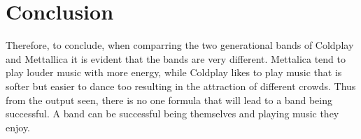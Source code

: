 \documentclass[11pt,preprint, authoryear]{elsarticle}
\numberwithin{equation}{section}
\numberwithin{figure}{section}
\numberwithin{table}{section}
\begin{document}
\hypertarget{conclusion}{%
\section{Conclusion}\label{conclusion}}

Therefore, to conclude, when comparring the two generational bands of
Coldplay and Mettallica it is evident that the bands are very different.
Mettalica tend to play louder music with more energy, while Coldplay
likes to play music that is softer but easier to dance too resulting in
the attraction of different crowds. Thus from the output seen, there is
no one formula that will lead to a band being successful. A band can be
successful being themselves and playing music they enjoy.


\end{document}
